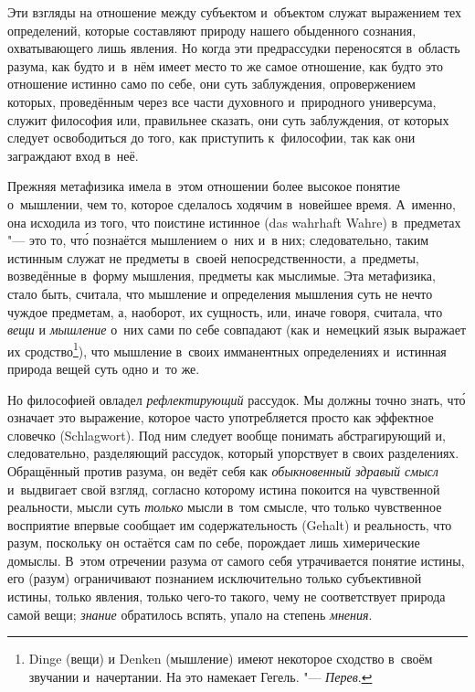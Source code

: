 Эти взгляды на отношение между субъектом и~объектом служат выражением тех
определений, которые составляют природу нашего обыденного
сознания, охватывающего лишь явления. Но когда эти предрассудки переносятся в~область разума, как будто
и~в~нём имеет место то же самое отношение, как будто это отношение истинно
само по себе,
они суть заблуждения, опровержением которых, проведённым
через все части духовного и~природного универсума, служит философия или,
правильнее сказать, они суть заблуждения, от которых следует
освободиться до того, как приступить к~философии, так как они заграждают
вход в~неё.

Прежняя метафизика имела в~этом отношении более высокое понятие о~мышлении,
чем то, которое сделалось ходячим в~новейшее время. А~именно, она исходила из
того, что поистине истинное (das wahrhaft Wahre) в~предметах "--- это то, чт\'{о} познаётся
мышлением о~них и~в них;
следовательно, таким истинным служат не предметы в~своей
непосредственности, а~предметы, возведённые в~форму мышления,
предметы как мыслимые. Эта метафизика, стало быть, считала, что мышление и
определения мышления суть не нечто чуждое предметам, а, наоборот, их
сущность, или, иначе говоря, считала, что {\em вещи} и
{\em мышление} о~них сами по себе совпадают (как и~немецкий
язык выражает их сродство\footnote{Dinge (вещи) и Denken (мышление) имеют
некоторое сходство в~своём звучании и~начертании. На это намекает
Гегель. "--- {\em Перев}.}), что мышление в~своих имманентных определениях
и~истинная природа вещей суть одно и~то же.

Но философией овладел {\em рефлектирующий} рассудок. Мы
должны точно знать, чт\'{о} означает это выражение, которое часто употребляется
просто как эффектное словечко (Schlagwort). Под ним следует вообще понимать
абстрагирующий и, следовательно, разделяющий рассудок, который упорствует в
своих разделениях. Обращённый против разума, он ведёт себя как
{\em обыкновенный здравый смысл} и~выдвигает свой
взгляд, согласно которому истина покоится на чувственной реальности, мысли
суть {\em только} мысли в~том смысле, что только
чувственное восприятие впервые сообщает им содержательность (Gehalt) и
реальность, что разум, поскольку он остаётся сам по себе, порождает лишь
химерические домыслы.
В~этом отречении разума от самого себя утрачивается понятие истины, его
(разум) ограничивают познанием исключительно только субъективной истины,
только явления, только чего-то такого, чему не соответствует природа самой
вещи; {\em знание} обратилось вспять, упало на степень {\em мнения}.

